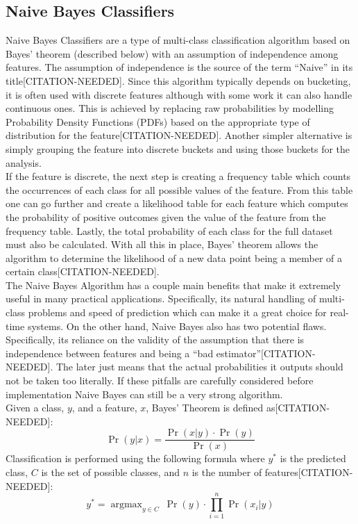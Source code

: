 \documentclass[titlepage]{article}
\DeclareMathOperator*{\argmax}{argmax}
\begin{document}
\subsection{Naive Bayes Classifiers}
Naive Bayes Classifiers are a type of multi-class classification algorithm based on Bayes' theorem (described below) with an assumption of independence among features. The assumption of independence is the source of the term ``Naive'' in its title[CITATION-NEEDED]. Since this algorithm typically depends on bucketing, it is often used with discrete features although with some work it can also handle continuous ones. This is achieved by replacing raw probabilities by modelling Probability Density Functions (PDFs) based on the appropriate type of distribution for the feature[CITATION-NEEDED]. Another simpler alternative is simply grouping the feature into discrete buckets and using those buckets for the analysis.\\
If the feature is discrete, the next step is creating a frequency table which counts the occurrences of each class for all possible values of the feature. From this table one can go further and create a likelihood table for each feature which computes the probability of positive outcomes given the value of the feature from the frequency table. Lastly, the total probability of each class for the full dataset must also be calculated. With all this in place, Bayes' theorem allows the algorithm to determine the likelihood of a new data point being a member of a certain class[CITATION-NEEDED].\\
The Naive Bayes Algorithm has a couple main benefits that make it extremely useful in many practical applications. Specifically, its natural handling of multi-class problems and speed of prediction which can make it a great choice for real-time systems. On the other hand, Naive Bayes also has two potential flaws. Specifically, its reliance on the validity of the assumption that there is independence between features and being a ``bad estimator''[CITATION-NEEDED]. The later just means that the actual probabilities it outputs should not be taken too literally. If these pitfalls are carefully considered before implementation Naive Bayes can still be a very strong algorithm.\\
Given a class, $y$, and a feature, $x$, Bayes' Theorem is defined as[CITATION-NEEDED]:
$$\Pr(y \vert x) = \frac{\Pr(x \vert y) \cdot \Pr(y)}{\Pr(x)}$$
Classification is performed using the following formula where $y^*$ is the predicted class, $C$ is the set of possible classes, and $n$ is the number of features[CITATION-NEEDED]:
$$y^* = \argmax_{y \in C}~\Pr(y) \cdot \prod\limits_{i=1}^n \Pr(x_i \vert y)$$
\end{document}
